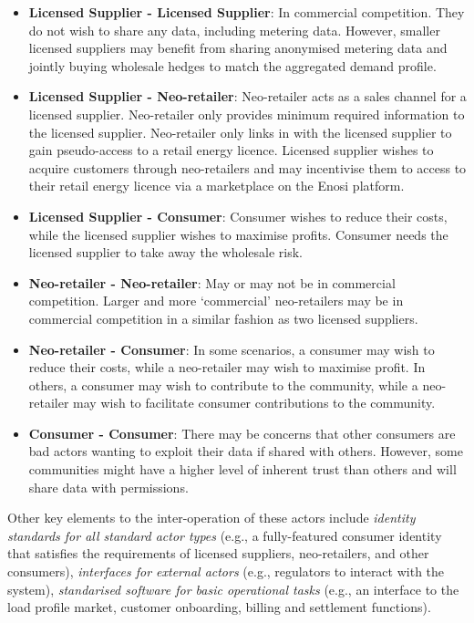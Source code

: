 \documentclass[a4paper,12pt,reqno]{amsart}
\theoremstyle{definition}
\begin{document}
\begin{itemize}

\item{ \textbf{Licensed Supplier - Licensed Supplier}:
In commercial competition. They do not wish to share any data, including metering data. However, smaller licensed suppliers may benefit from sharing anonymised metering data and jointly buying wholesale hedges to match the aggregated demand profile.}

\item{ \textbf{Licensed Supplier - Neo-retailer}:
Neo-retailer acts as a sales channel for a licensed supplier. Neo-retailer only provides minimum required information to the licensed supplier. Neo-retailer only links in with the licensed supplier to gain pseudo-access to a retail energy licence. Licensed supplier wishes to acquire customers through neo-retailers and may incentivise them to access to their retail energy licence via a marketplace on the Enosi platform.}

\item{ \textbf{Licensed Supplier - Consumer}:
Consumer wishes to reduce their costs, while the licensed supplier wishes to maximise profits. Consumer needs the licensed supplier to take away the wholesale risk.}

\item{ \textbf{Neo-retailer - Neo-retailer}:
May or may not be in commercial competition. Larger and more `commercial' neo-retailers may be in commercial competition in a similar fashion as two licensed suppliers.}

\item{ \textbf{Neo-retailer - Consumer}:
In some scenarios, a consumer may wish to reduce their costs, while a neo-retailer may wish to maximise profit. In others, a consumer may wish to contribute to the community, while a neo-retailer may wish to facilitate consumer contributions to the community.}

\item{ \textbf{Consumer - Consumer}:
There may be concerns that other consumers are bad actors wanting to exploit their data if shared with others. However, some communities might have a higher level of inherent trust than others and will share data with permissions.}

\end{itemize}


Other key elements to the inter-operation of these actors include \textit{identity standards for all standard actor types} (e.g., a fully-featured consumer identity that satisfies the requirements of licensed suppliers, neo-retailers, and other consumers), \textit{interfaces for external actors} (e.g., regulators to interact with the system), \textit{standarised software for basic operational tasks} (e.g., an interface to the load profile market, customer onboarding, billing and settlement functions). 
\end{document}
